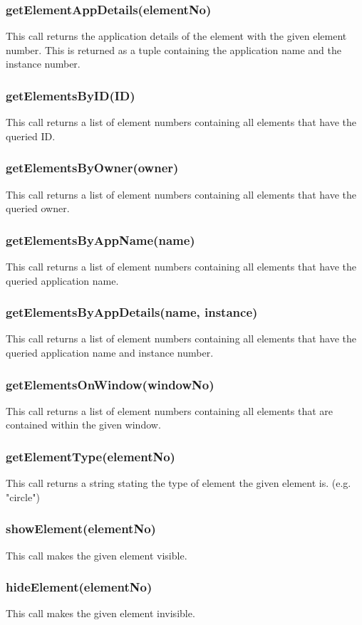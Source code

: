 \documentclass{acm_proc_article-sp}
\begin{document}
\subsubsection{getElementAppDetails(elementNo)}
This call returns the application details of the element with the given element number. This is returned as a tuple containing the application name and the instance number.
\subsubsection{getElementsByID(ID)}
This call returns a list of element numbers containing all elements that have the queried ID.
\subsubsection{getElementsByOwner(owner)}
This call returns a list of element numbers containing all elements that have the queried owner.
\subsubsection{getElementsByAppName(name)}
This call returns a list of element numbers containing all elements that have the queried application name.
\subsubsection{getElementsByAppDetails(name, instance)}
This call returns a list of element numbers containing all elements that have the queried application name and instance number.
\subsubsection{getElementsOnWindow(windowNo)}
This call returns a list of element numbers containing all elements that are contained within the given window.
\subsubsection{getElementType(elementNo)}
This call returns a string stating the type of element the given element is. (e.g. "circle")
\subsubsection{showElement(elementNo)}
This call makes the given element visible.
\subsubsection{hideElement(elementNo)}
This call makes the given element invisible.
\end{document}
